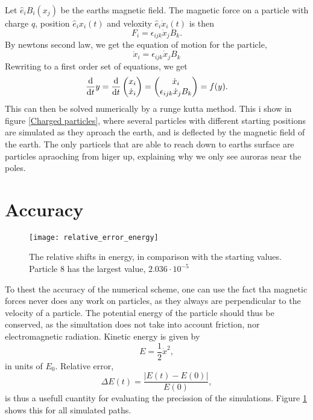 \documentclass{article}
\begin{document}
        Let $ \hat e_i B_i(x_j)$ be the earths magnetic field. The magnetic force on a particle with charge $q$, position $\hat e_i x_i(t)$ and veloxity $\hat e_i \dot x_i (t)$ is then
        \begin{equation}
            F_i = \epsilon_{ijk} \dot x_j B_k.
        \end{equation}
        By newtons second law, we get the equation of motion for the particle,
        \begin{equation}
            \ddot x_i = \epsilon_{ijk} \dot x_j B_k
        \end{equation}
        Rewriting to a first order set of equations, we get
        \begin{align*}
            \dv{t} y = \dv{t} 
            \begin{pmatrix}
                x_i \\
                \dot x_i
            \end{pmatrix}
            = 
            \begin{pmatrix}
                \dot x_i \\
                \epsilon_{ijk} \dot x_j B_k
            \end{pmatrix}
            = f(y).
        \end{align*}
        This can then be solved numerically by a runge kutta method. This i show in figure \ref{Charged particles}, where several particles with different starting positions are simulated as they aproach the earth, and is deflected by the magnetic field of the earth. The only particels that are able to reach down to earths surface are particles apraoching from higer up, explaining why we only see auroras near the poles.

    \section*{Accuracy}
    \begin{figure}
        \centering
        \texttt{[image: relative\_error\_energy]}
        \label{Relative error}
        \caption{The relative shifts in energy, in comparison with the starting values. Particle 8 has the largest value, $2.036 \cdot 10^{-5}$}
    \end{figure}

    To thest the accuracy of the numerical scheme, one can use the fact tha magnetic forces never does any work on particles, as they always are perpendicular to the velocity of a particle. The potential energy of the particle should thus be conserved, as the simultation does not take into account friction, nor electromagnetic radiation. Kinetic energy is given by
    $$
        E = \frac{1}{2}\dot x^2,
    $$
    in units of $E_0$. Relative error,
    $$
        \Delta E(t) = \frac{|E(t) - E(0)|}{E(0)},
    $$
    is thus a usefull cuantity for evaluating the precission of the simulations. Figure \ref{Relative error} shows this for all simulated paths.
\end{document}
